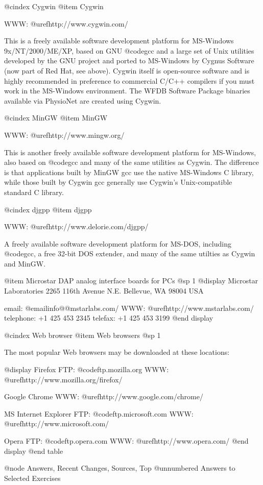 {{{{{{{{@cindex Cygwin
@item Cygwin

WWW: @uref{http://www.cygwin.com/}

This is a freely available software development platform for MS-Windows
9x/NT/2000/ME/XP, based on GNU @code{gcc} and a large set of Unix
utilities developed by the GNU project and ported to MS-Windows by
Cygnus Software (now part of Red Hat, see above).  Cygwin itself is
open-source software and is highly recommended in preference to
commercial C/C++ compilers if you must work in the MS-Windows
environment.  The WFDB Software Package binaries available via PhysioNet
are created using Cygwin.

@cindex MinGW
@item MinGW

WWW: @uref{http://www.mingw.org/}

This is another freely available software development platform for MS-Windows,
also based on @code{gcc} and many of the same utilities as Cygwin.  The
difference is that applications built by MinGW gcc use the native MS-Windows C
library, while those built by Cygwin gcc generally use Cygwin's Unix-compatible
standard C library.  

@cindex djgpp
@item djgpp

WWW: @uref{http://www.delorie.com/djgpp/}

A freely available software development platform for MS-DOS, including
@code{gcc}, a free 32-bit DOS extender, and many of the same utilties
as Cygwin and MinGW.

@item Microstar DAP analog interface boards for PCs
@sp 1
@display
Microstar Laboratories
2265 116th Avenue N.E.
Bellevue, WA 98004 USA

email: @email{info@@mstarlabs.com/}
WWW: @uref{http://www.mstarlabs.com/}
telephone: +1 425 453 2345
telefax: +1 425 453 3199
@end display

@cindex Web browser
@item Web browsers
@sp 1

The most popular Web browsers may be downloaded at these locations:

@display
Firefox
FTP: @code{ftp.mozilla.org}
WWW: @uref{http://www.mozilla.org/firefox/}

Google Chrome
WWW: @uref{http://www.google.com/chrome/}

MS Internet Explorer
FTP: @code{ftp.microsoft.com}
WWW: @uref{http://www.microsoft.com/}

Opera
FTP: @code{ftp.opera.com}
WWW: @uref{http://www.opera.com/}
@end display
@end table

@node     Answers, Recent Changes, Sources, Top
@unnumbered Answers to Selected Exercises

}}}}}}}}
